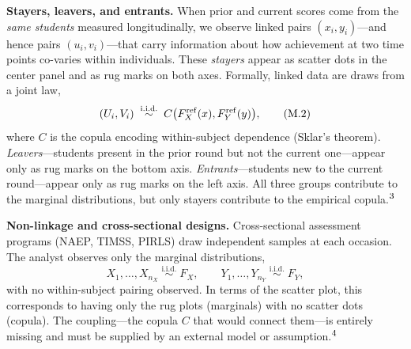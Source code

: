 \documentclass[10pt]{article}
\begin{document}
\begin{minipage}[t]{7.8in}
\begin{minipage}{7.4in}
    \vspace{6pt}
    \textbf{Stayers, leavers, and entrants.}\enspace
    When prior and current scores come from the \emph{same students} measured
    longitudinally, we observe linked pairs $(x_i, y_i)$---and hence pairs
    $(u_i, v_i)$---that carry information about how achievement at two time
    points co-varies within individuals. These \emph{stayers} appear as
    scatter dots in the center panel and as rug marks on both axes. Formally,
    linked data are draws from a joint law,
    \begin{equation}
      (U_i, V_i) \;\stackrel{\text{i.i.d.}}{\sim}\; C\bigl(F_X^{\mathrm{ref}}(x), F_Y^{\mathrm{ref}}(y)\bigr),
      \tag{M.2}
    \end{equation}
    where $C$ is the copula encoding within-subject dependence (Sklar's theorem).
    \emph{Leavers}---students present in the prior round but not the
    current one---appear only as rug marks on the bottom axis. \emph{Entrants}---students
    new to the current round---appear only as rug marks on the left axis. All
    three groups contribute to the marginal distributions, but only stayers
    contribute to the empirical copula.$^{\mbox{\footnotesize{3}}}$

    \vspace{6pt}
    \textbf{Non-linkage and cross-sectional designs.}\enspace
    Cross-sectional assessment programs (NAEP, TIMSS, PIRLS) draw independent
    samples at each occasion. The analyst observes only the marginal
    distributions,
    \begin{equation}
      X_1,\dots,X_{n_X} \;\stackrel{\text{i.i.d.}}{\sim}\; F_X,
      \qquad
      Y_1,\dots,Y_{n_Y} \;\stackrel{\text{i.i.d.}}{\sim}\; F_Y,
      \tag{M.3}
    \end{equation}
    with no within-subject pairing observed. In terms of the scatter plot,
    this corresponds to having only the rug plots (marginals) with no scatter
    dots (copula). The coupling---the copula $C$ that would connect them---is
    entirely missing and must be supplied by an external model or
    assumption.$^{\mbox{\footnotesize{4}}}$


\end{minipage}
\end{minipage}
\end{document}
